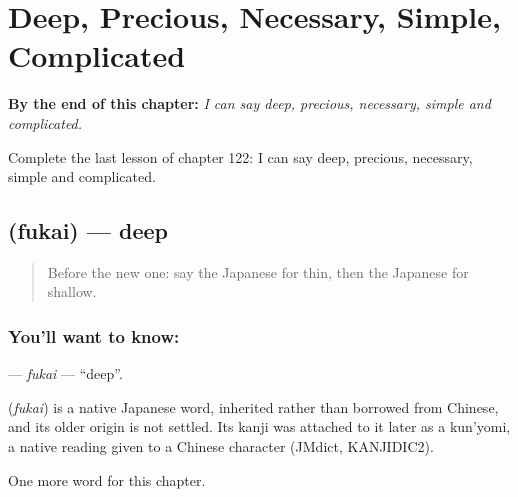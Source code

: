 
\chapter{Deep, Precious, Necessary, Simple, Complicated}
\label{ch:ja-deep-precious-necessary-simple-complicated}

\begin{chapteropening}
\textbf{By the end of this chapter:} \emph{I can say deep, precious, necessary, simple and complicated.}

Complete the last lesson of chapter 122: I can say deep, precious, necessary, simple and complicated.
\end{chapteropening}

\section[\texorpdfstring{\ja{ふかい} (fukai)}{ふかい (fukai)}]{ (fukai) — deep}

\label{lesson:JA-C122-fukai}



\begin{quote}
Before the new one: say the Japanese for thin, then the Japanese for shallow.
\end{quote}

\subsection*{You'll want to know: }
\textbf{} — \emph{fukai} — \textquotedblleft{}deep\textquotedblright{}.

\begin{cousinweb}
\textbf{} (\emph{fukai}) is a native Japanese word, inherited rather than borrowed from Chinese, and its older origin is not settled. Its kanji was attached to it later as a kun'yomi, a native reading given to a Chinese character (JMdict, KANJIDIC2).
\end{cousinweb}

\begin{grammarlens}[title={What you've built}]
One more word for this chapter.
\end{grammarlens}

